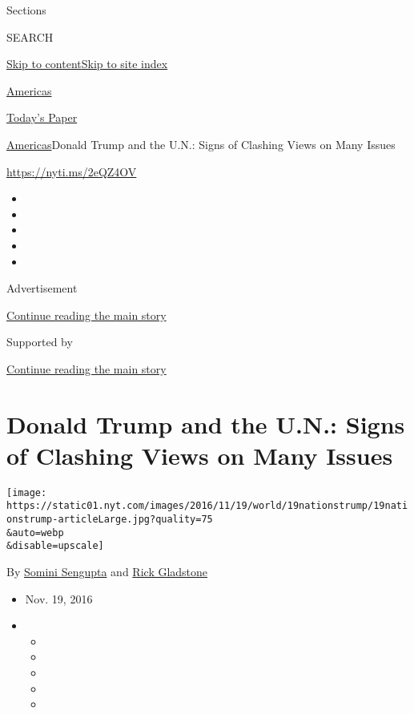 Sections

SEARCH

\protect\hyperlink{site-content}{Skip to
content}\protect\hyperlink{site-index}{Skip to site index}

\href{https://www.nytimes.com/section/world/americas}{Americas}

\href{https://myaccount.nytimes.com/auth/login?response_type=cookie\&client_id=vi}{}

\href{https://www.nytimes.com/section/todayspaper}{Today's Paper}

\href{/section/world/americas}{Americas}\textbar{}Donald Trump and the
U.N.: Signs of Clashing Views on Many Issues

\url{https://nyti.ms/2eQZ4OV}

\begin{itemize}
\item
\item
\item
\item
\item
\end{itemize}

Advertisement

\protect\hyperlink{after-top}{Continue reading the main story}

Supported by

\protect\hyperlink{after-sponsor}{Continue reading the main story}

\hypertarget{donald-trump-and-the-un-signs-of-clashing-views-on-many-issues}{%
\section{Donald Trump and the U.N.: Signs of Clashing Views on Many
Issues}\label{donald-trump-and-the-un-signs-of-clashing-views-on-many-issues}}

\texttt{[image: https://static01.nyt.com/images/2016/11/19/world/19nationstrump/19nationstrump-articleLarge.jpg?quality=75\\\&auto=webp\\\&disable=upscale]}

By \href{http://www.nytimes.com/by/somini-sengupta}{Somini Sengupta} and
\href{https://www.nytimes.com/by/rick-gladstone}{Rick Gladstone}

\begin{itemize}
\item
  Nov. 19, 2016
\item
  \begin{itemize}
  \item
  \item
  \item
  \item
  \item
  \end{itemize}
\end{itemize}

